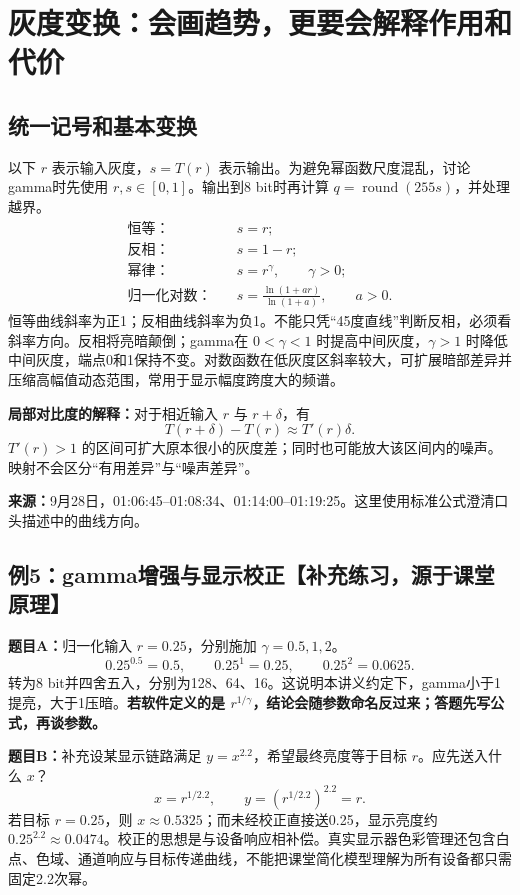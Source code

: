 \section{灰度变换：会画趋势，更要会解释作用和代价}
\subsection{统一记号和基本变换}
以下 $r$ 表示输入灰度，$s=T(r)$ 表示输出。为避免幂函数尺度混乱，讨论gamma时先使用 $r,s\in[0,1]$。输出到8 bit时再计算 $q=\operatorname{round}(255s)$，并处理越界。
\begin{align}
\text{恒等：}\quad&s=r;\\
\text{反相：}\quad&s=1-r;\\
\text{幂律：}\quad&s=r^\gamma,\qquad\gamma>0;\\
\text{归一化对数：}\quad&s=\frac{\ln(1+ar)}{\ln(1+a)},\qquad a>0.
\end{align}
恒等曲线斜率为正1；反相曲线斜率为负1。不能只凭“45度直线”判断反相，必须看斜率方向。反相将亮暗颠倒；gamma在 $0<\gamma<1$ 时提高中间灰度，$\gamma>1$ 时降低中间灰度，端点0和1保持不变。对数函数在低灰度区斜率较大，可扩展暗部差异并压缩高幅值动态范围，常用于显示幅度跨度大的频谱。

\textbf{局部对比度的解释：}对于相近输入 $r$ 与 $r+\delta$，有
\[
T(r+\delta)-T(r)\approx T'(r)\delta.
\]
$T'(r)>1$ 的区间可扩大原本很小的灰度差；同时也可能放大该区间内的噪声。映射不会区分“有用差异”与“噪声差异”。

\noindent\textbf{来源：}9月28日，01:06:45--01:08:34、01:14:00--01:19:25。这里使用标准公式澄清口头描述中的曲线方向。

\subsection{例5：gamma增强与显示校正【补充练习，源于课堂原理】}
\textbf{题目A：}归一化输入 $r=0.25$，分别施加 $\gamma=0.5,1,2$。
\[
0.25^{0.5}=0.5,\qquad0.25^1=0.25,\qquad0.25^2=0.0625.
\]
转为8 bit并四舍五入，分别为128、64、16。这说明本讲义约定下，gamma小于1提亮，大于1压暗。\textbf{若软件定义的是 $r^{1/\gamma}$，结论会随参数命名反过来；答题先写公式，再谈参数。}

\textbf{题目B：}补充设某显示链路满足 $y=x^{2.2}$，希望最终亮度等于目标 $r$。应先送入什么 $x$？
\[
x=r^{1/2.2},\qquad y=(r^{1/2.2})^{2.2}=r.
\]
若目标 $r=0.25$，则 $x\approx0.5325$；而未经校正直接送0.25，显示亮度约 $0.25^{2.2}\approx0.0474$。校正的思想是与设备响应相补偿。真实显示器色彩管理还包含白点、色域、通道响应与目标传递曲线，不能把课堂简化模型理解为所有设备都只需固定2.2次幂。

